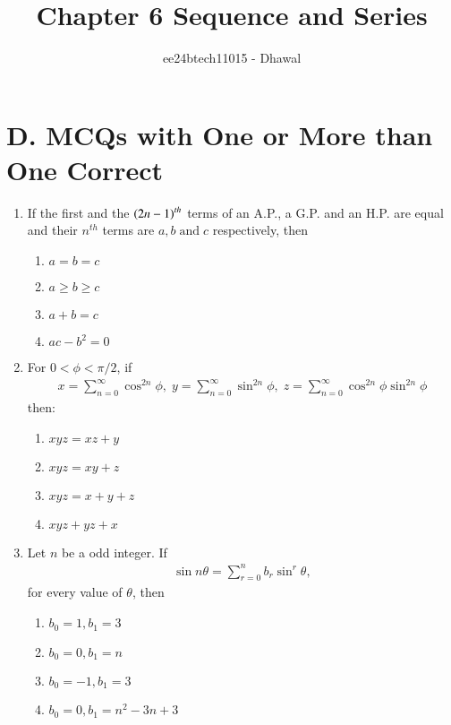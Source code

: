 \documentclass[journal]{IEEEtran}
\theoremstyle{remark}
\begin{document}

\onecolumn

\title{Chapter 6 Sequence and Series}
\author{ee24btech11015 - Dhawal}
\maketitle

\renewcommand{\thefigure}{\theenumi}
\renewcommand{\thetable}{\theenumi}

\section*{D. MCQs with One or More than One Correct}
\begin{enumerate}
	\item If the first and the $\left(2n-1\right)^{th}$ terms of an A.P., a G.P. and an H.P. are equal and their $n^{th}$ terms are $a, b \; \text{and} \; c$ respectively, then \hfill{}

\begin{multicols}{4}
\begin{enumerate}
\item $a=b=c$
\item $a \geq b \geq c$
\item $a+b=c$
\item $ac-b^2=0$
\end{enumerate}
\end{multicols}

\item For $0 < \phi < \pi /2$, if 
\begin{align*}
x=\sum_{n=0}^{\infty} \cos^{2n} \phi , \;
y=\sum_{n=0}^{\infty} \sin^{2n} \phi , \;
z=\sum_{n=0}^{\infty} \cos^{2n} \phi \sin^{2n} \phi
\end{align*}
then: \hfill{}
\begin{multicols}{4}
\begin{enumerate}
\item $xyz=xz+y$
\item $xyz=xy+z$
\item $xyz=x+y+z$
\item $xyz+yz+x$
\end{enumerate}
\end{multicols}

\item Let $n$ be a odd integer. If 
\begin{align*}
\sin n\theta= \sum_{r=0}^{n} b_r \sin^{r} \theta, 
\end{align*}
for every value of $\theta$, then
\hfill{}
\begin{multicols}{2}
\begin{enumerate}
\item $b_0=1, b_1=3$
\item $b_0=0, b_1=n$
\item $b_0=-1, b_1=3$
\item $b_0=0, b_1=n^2-3n+3$
\end{enumerate}
\end{multicols}


\end{enumerate}
\end{document}
